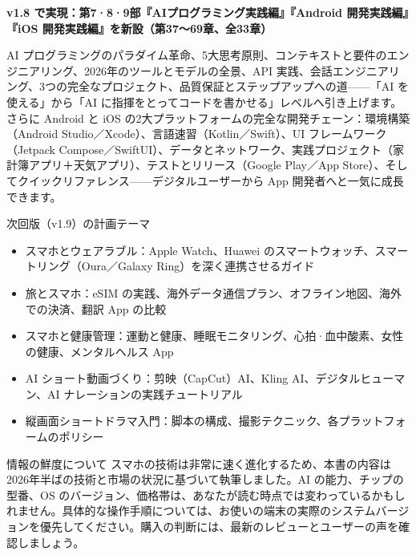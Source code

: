 

\textbf{v1.8 で実現：第7·8·9部『AIプログラミング実践編』『Android 開発実践編』『iOS 開発実践編』を新設（第37〜69章、全33章）}\par

AI プログラミングのパラダイム革命、5大思考原則、コンテキストと要件のエンジニアリング、2026年のツールとモデルの全景、API 実践、会話エンジニアリング、3つの完全なプロジェクト、品質保証とステップアップへの道——「AI を使える」から「AI に指揮をとってコードを書かせる」レベルへ引き上げます。さらに Android と iOS の2大プラットフォームの完全な開発チェーン：環境構築（Android Studio／Xcode）、言語速習（Kotlin／Swift）、UI フレームワーク（Jetpack Compose／SwiftUI）、データとネットワーク、実践プロジェクト（家計簿アプリ＋天気アプリ）、テストとリリース（Google Play／App Store）、そしてクイックリファレンス——デジタルユーザーから App 開発者へと一気に成長できます。

\begin{tcbinfo}{次回版（v1.9）の計画テーマ}
\begin{itemize}
  \item スマホとウェアラブル：Apple Watch、Huawei のスマートウォッチ、スマートリング（Oura／Galaxy Ring）を深く連携させるガイド
  \item 旅とスマホ：eSIM の実践、海外データ通信プラン、オフライン地図、海外での決済、翻訳 App の比較
  \item スマホと健康管理：運動と健康、睡眠モニタリング、心拍·血中酸素、女性の健康、メンタルヘルス App
  \item AI ショート動画づくり：剪映（CapCut）AI、Kling AI、デジタルヒューマン、AI ナレーションの実践チュートリアル
  \item 縦画面ショートドラマ入門：脚本の構成、撮影テクニック、各プラットフォームのポリシー
\end{itemize}

\end{tcbinfo}

\begin{tcbwarn}{情報の鮮度について}
スマホの技術は非常に速く進化するため、本書の内容は2026年半ばの技術と市場の状況に基づいて執筆しました。AI の能力、チップの型番、OS のバージョン、価格帯は、あなたが読む時点では変わっているかもしれません。具体的な操作手順については、お使いの端末の実際のシステムバージョンを優先してください。購入の判断には、最新のレビューとユーザーの声を確認しましょう。

\end{tcbwarn}
